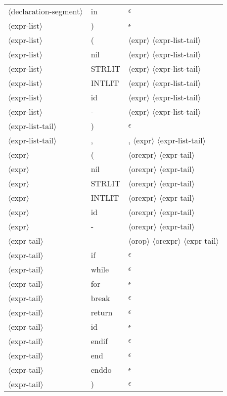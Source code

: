 \documentclass[11pt, fleqn]{article}
\newcommand{\atag}[1]{$\langle$#1$\rangle$}
\begin{document}
\begin{longtable}{l|l|l}
\atag{declaration-segment}		&	in			&	$\epsilon$	\\
\atag{expr-list}					&	)			&	$\epsilon$				\\
\atag{expr-list}					&	(			&	\atag{expr} \atag{expr-list-tail}				\\
\atag{expr-list}					&	nil			&	\atag{expr} \atag{expr-list-tail}				\\
\atag{expr-list}					&	STRLIT		&	\atag{expr} \atag{expr-list-tail}				\\
\atag{expr-list}					&	INTLIT			&	\atag{expr} \atag{expr-list-tail}				\\
\atag{expr-list}					&	id			&	\atag{expr} \atag{expr-list-tail}				\\
\atag{expr-list}					&	-			&	\atag{expr} \atag{expr-list-tail}				\\
\atag{expr-list-tail}			&	)			&	$\epsilon$								\\
\atag{expr-list-tail}			&	,			&	, \atag{expr} \atag{expr-list-tail}		\\
\atag{expr}						&	(			&	\atag{orexpr} \atag{expr-tail}	\\
\atag{expr}						&	nil			&	\atag{orexpr} \atag{expr-tail}	\\
\atag{expr}						&	STRLIT			&	\atag{orexpr} \atag{expr-tail}	\\
\atag{expr}						&	INTLIT			&	\atag{orexpr} \atag{expr-tail}	\\
\atag{expr}						&	id			&	\atag{orexpr} \atag{expr-tail}	\\
\atag{expr}						&	-			&	\atag{orexpr} \atag{expr-tail}	\\
\atag{expr-tail}					&	\textbar		&	\atag{orop} \atag{orexpr} \atag{expr-tail}		\\
\atag{expr-tail}					&	if		&		$\epsilon$	\\
\atag{expr-tail}					&	while		&	$\epsilon$		\\
\atag{expr-tail}					&	for		&	$\epsilon$		\\
\atag{expr-tail}					&	break		&	$\epsilon$		\\
\atag{expr-tail}					&	return		&	$\epsilon$		\\
\atag{expr-tail}					&	id		&		$\epsilon$	\\
\atag{expr-tail}					&	endif		&	$\epsilon$		\\
\atag{expr-tail}					&	end		&	$\epsilon$		\\
\atag{expr-tail}					&	enddo	&	$\epsilon$		\\
\atag{expr-tail}					&	)		&	$\epsilon$		\\

\end{longtable}
\end{document}
